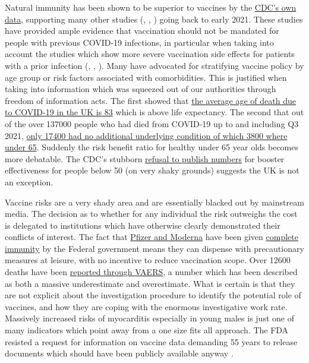 \documentclass[11pt,a4paper]{article}
\begin{document}
Natural immunity has been shown to be superior to vaccines by the \href{https://www.cdc.gov/mmwr/volumes/71/wr/mm7104e1.htm#F1_down}{CDC's own data}, supporting many other studies (\cite{Gazit2021.08.24.21262415}, \cite{doi:10.1126/science.abf4063}, \cite{Goldberg2021.04.20.21255670}) going back to early 2021. These studies have provided ample evidence that vaccination should not be mandated for people with previous COVID-19 infections, in particular when taking into account the studies which show more severe vaccination side effects for patients with a prior infection (\cite{Monforte2021}, \cite{LI20221082}, \cite{Raw22}). Many have advocated for stratifying vaccine policy by age group or risk factors associated with comorbidities. This is justified when taking into information which was squeezed out of our authorities through freedom of information acts. The first showed that \href{https://www.ons.gov.uk/aboutus/transparencyandgovernance/freedomofinformationfoi/averageageofthosewhohaddiedwithcovid19}{the average age of death due to COVID-19 in the UK is 83} which is above life expectancy. The second that out of the over 137000 people who had died from COVID-19 up to and including Q3 2021, \href{https://www.ons.gov.uk/aboutus/transparencyandgovernance/freedomofinformationfoi/deathsfromcovid19withnootherunderlyingcauses}{only 17400 had no additional underlying condition of which 3800 where under 65}. Suddenly the risk benefit ratio for healthy under 65 year olds becomes more debatable. The CDC's stubborn \href{https://www.dailymail.co.uk/news/article-10537161/CDC-refusing-publish-data-collected-booster-effectiveness-aged-18-49.html}{refusal to publish numbers} for booster effectiveness for people below 50 (on very shaky grounds) suggests the UK is not an exception. 

Vaccine risks are a very shady area and are essentially blacked out by mainstream media. The decision as to whether for any individual the risk outweighs the cost is delegated to institutions which have otherwise clearly demonstrated their conflicts of interest. The fact that \href{https://www.cnbc.com/2020/12/16/covid-vaccine-side-effects-compensation-lawsuit.html}{Pfizer and Moderna} have been given \href{https://crsreports.congress.gov/product/pdf/LSB/LSB10443}{complete immunity} by the Federal government means they can dispense with precautionary measures at leisure, with no incentive to reduce vaccination scope. Over 12600 deaths have been \href{https://www.cdc.gov/coronavirus/2019-ncov/vaccines/safety/adverse-events.html}{reported through VAERS}, a number which has been described as both a massive underestimate and overestimate. What is certain is that they are not explicit about the investigation procedure to identify the potential role of vaccines, and how they are coping with the enormous investigative work rate. Massively increased risks of myocarditis especially in young males \cite{10.1001/jama.2021.24110} is just one of many indicators which point away from a one size fits all approach. The FDA resisted a request for information on vaccine data demanding 55 years to release documents which should have been publicly available anyway \cite{mailonline19112021}.
\end{document}
